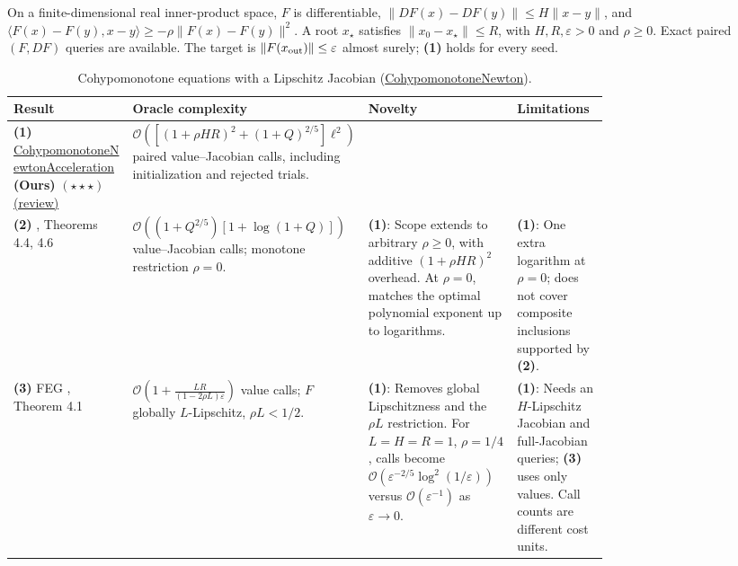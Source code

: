 \begin{table}[tp]
\centering
\caption{Cohypomonotone equations with a Lipschitz Jacobian (\href{https://github.com/k3nfalt/longtails/blob/main/LongTails/Setups/CohypomonotoneNewton.lean}{CohypomonotoneNewton}).}\label{tab:CohypomonotoneNewton}
\parbox{\linewidth}{\footnotesize On a finite-dimensional real inner-product space, $F$ is differentiable, $\|DF(x)-DF(y)\|\le H\|x-y\|$, and $\langle F(x)-F(y),x-y\rangle\ge-\rho\|F(x)-F(y)\|^2$. A root $x_\star$ satisfies $\|x_0-x_\star\|\le R$, with $H,R,\varepsilon>0$ and $\rho\ge0$. Exact paired $(F,DF)$ queries are available. The target is $\|F(x_{\rm out})\|\le\varepsilon$ almost surely; \textbf{(1)} holds for every seed.}\par\smallskip
\begin{threeparttable}
\footnotesize
\setlength{\tabcolsep}{4pt}\renewcommand{\arraystretch}{1.25}
\begin{tabularx}{\linewidth}{@{}>{\raggedright\arraybackslash}p{0.20\linewidth}>{\raggedright\arraybackslash}p{0.32\linewidth}>{\raggedright\arraybackslash}p{0.25\linewidth}>{\raggedright\arraybackslash}X@{}}
\toprule
\textbf{Result} & \textbf{Oracle complexity} & \textbf{Novelty} & \textbf{Limitations} \\
\midrule
\textbf{(1)} \href{https://github.com/k3nfalt/longtails/blob/main/LongTails/Theorems/CohypomonotoneNewtonAcceleration.lean}{Cohypomonotone\allowbreak Newton\allowbreak Acceleration} \textbf{(Ours)} $(\star\star\star)$ \href{https://github.com/k3nfalt/longtails/blob/main/scripts/reviews/CohypomonotoneNewtonAcceleration.md}{(review)} & $\mathcal{O}\!\left([(1+\rho HR)^2+(1+Q)^{2/5}]\ell^2\right)$ paired value--Jacobian calls, including initialization and rejected trials. & & \\
\midrule[1.2pt]
\textbf{(2)} \citep{cohypJYv1}, Theorems 4.4, 4.6 & $\mathcal{O}\!\left((1+Q^{2/5})[1+\log(1+Q)]\right)$ value--Jacobian calls; monotone restriction $\rho=0$. & \textbf{(1)}: Scope extends to arbitrary $\rho\ge0$, with additive $(1+\rho HR)^2$ overhead. At $\rho=0$, matches the optimal polynomial exponent up to logarithms. & \textbf{(1)}: One extra logarithm at $\rho=0$; does not cover composite inclusions supported by \textbf{(2)}. \\
\midrule
\textbf{(3)} FEG \citep{glmLeeKim2021v3}, Theorem 4.1 & $\mathcal{O}\!\left(1+\frac{LR}{(1-2\rho L)\varepsilon}\right)$ value calls; $F$ globally $L$-Lipschitz, $\rho L<1/2$. & \textbf{(1)}: Removes global Lipschitzness and the $\rho L$ restriction. For $L=H=R=1$, $\rho=1/4$, calls become $\mathcal{O}(\varepsilon^{-2/5}\log^2(1/\varepsilon))$ versus $\mathcal{O}(\varepsilon^{-1})$ as $\varepsilon\to0$. & \textbf{(1)}: Needs an $H$-Lipschitz Jacobian and full-Jacobian queries; \textbf{(3)} uses only values. Call counts are different cost units. \\

\end{tabularx}
\end{threeparttable}
\end{table}

